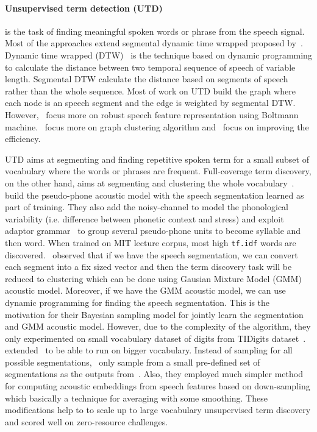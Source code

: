 \documentclass[12pt,twoside,final,hidelinks]{ltthesis}
\theoremstyle{definition}
\begin{document}
\paragraph{Unsupervised term detection (UTD)} is the task of finding meaningful spoken words or phrase from the speech signal. Most of the approaches extend 
segmental dynamic time wrapped proposed by~. Dynamic time wrapped (DTW)~\cite{Berndt:1994:UDT:3000850.3000887} is the technique based on dynamic programming to calculate the 
distance between two temporal sequence of speech of variable length. Segmental DTW calculate the distance based on segments of speech rather than the whole sequence. 
Most of work on UTD build the graph where each node is an speech segment and the 
edge is weighted by segmental DTW. However,~ focus more on robust speech feature representation using Boltmann machine.~ focus more on graph clustering algorithm and~ focus on improving the efficiency. 

UTD aims at segmenting and finding repetitive spoken term for a small subset of vocabulary where the words or phrases are frequent. Full-coverage term discovery, on 
the other hand, aims at segmenting and clustering the whole vocabulary~\cite{Lee:TACL15,KamperJG16a,Kamper2015FullyUS,RasanenDF15}.~ build 
the pseudo-phone acoustic model with the speech segmentation learned as part of training. They also add the noisy-channel to model the phonological variability (i.e. 
difference between phonetic context and stress) and exploit adaptor grammar~\cite{JohnsonGG06} to group several pseudo-phone units to become syllable and then word. 
When trained on MIT lecture corpus, most high \texttt{tf.idf} words are discovered.~ observed that if we have the speech segmentation, we 
can convert each segment into a fix sized vector and then the term discovery task will be reduced to clustering which can be done using Gausian Mixture Model (GMM) 
acoustic model. Moreover, if we have the GMM acoustic model, we can use dynamic programming for finding the speech segmentation. This is the motivation for their 
Bayesian sampling model for jointly learn the segmentation and GMM acoustic model. However, due to the complexity of the algorithm, they only experimented on small 
vocabulary dataset of digits from TIDigits dataset~\cite{Tidigit_dataset}.~ extended~ to be able to run on bigger 
vocabulary. Instead of sampling for all possible segmentations,~ only sample from a small pre-defined set of segmentations as the outputs 
from~. Also, they employed much simpler method for computing acoustic embeddings from speech features based on down-sampling which basically a 
technique for averaging with some smoothing. These modifications help to to scale up to large vocabulary unsupervised term discovery and scored well on zero-resource challenges. 
\end{document}
